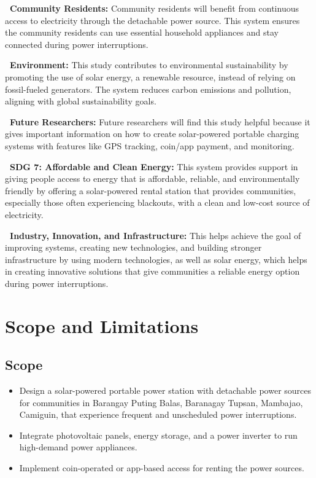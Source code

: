 {\vspace{0.6em} 
\addtocounter{subsection}{1}
\noindent\textbf{\thesubsection\ Community Residents:} 
Community residents will benefit from continuous access to electricity through the detachable power source. This system ensures the community residents can use essential household appliances and stay connected during power interruptions.

\vspace{0.6em} 
\addtocounter{subsection}{1}
\noindent\textbf{\thesubsection\ Environment:} 
This study contributes to environmental sustainability by promoting the use of solar energy, a renewable resource, instead of relying on fossil-fueled generators. The system reduces carbon emissions and pollution, aligning with global sustainability goals.

\vspace{0.6em} 
\addtocounter{subsection}{1}
\noindent\textbf{\thesubsection\ Future Researchers:} 
Future researchers will find this study helpful because it gives important information on how to create solar-powered portable charging systems with features like GPS tracking, coin/app payment, and monitoring. 

\vspace{0.6em} 
\addtocounter{subsection}{1}
\noindent\textbf{\thesubsection\ SDG 7: Affordable and Clean Energy:} 
This system provides support in giving people access to energy that is affordable, reliable, and environmentally friendly by offering a solar-powered rental station that provides communities, especially those often experiencing blackouts, with a clean and low-cost source of electricity.

\vspace{0.6em} 
\addtocounter{subsection}{1}
\noindent\textbf{\thesubsection\ Industry, Innovation, and Infrastructure:} 
 This helps achieve the goal of improving systems, creating new technologies, and building stronger infrastructure by using modern technologies, as well as solar energy, which helps in creating innovative solutions that give communities a reliable energy option during power interruptions.


\section{Scope and Limitations}

\subsection{Scope}
	\begin{itemize}
		\item Design a solar-powered portable power station with detachable power sources for communities in Barangay Puting Balas, Baranagay Tupsan, Mambajao, Camiguin, that experience frequent and unscheduled power interruptions.
		\item Integrate photovoltaic panels, energy storage, and a power inverter to run high-demand power appliances.
		\item Implement coin-operated or app-based access for renting the power sources.


\end{itemize}}
